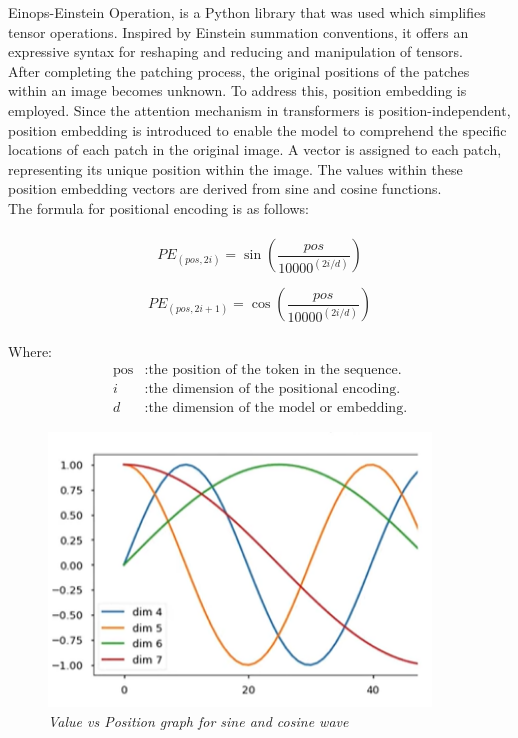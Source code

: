 Einops-Einstein Operation, is a Python library that was used which simplifies tensor operations. Inspired by Einstein summation conventions, it offers an expressive syntax for reshaping and reducing and manipulation of tensors. \\

After completing the patching process, the original positions of the patches within an image becomes unknown. To address this, position embedding is employed. Since the attention mechanism in transformers is position-independent, position embedding is introduced to enable the model to comprehend the specific locations of each patch in the original image. A vector is assigned to each patch, representing its unique position within the image. The values within these position embedding vectors are derived from sine and cosine functions.\\
The formula for positional encoding is as follows:\\
\\
\[
PE_{(pos, 2i)} = \sin\left(\frac{pos}{{10000}^{(2i/d)}}\right)
\]

\[
PE_{(pos, 2i+1)} = \cos\left(\frac{pos}{{10000}^{(2i/d)}}\right)
\]
\\
Where:
\begin{align*}
    \text{pos} & : \text{the position of the token in the sequence.} \\
    i & : \text{the dimension of the positional encoding.} \\
    d & : \text{the dimension of the model or embedding.}
\end{align*}

\begin{figure}[htbp]
    \centering
    \includegraphics[width=4in]{img/plot for sine and cosine wave.png}
    \caption{\textit{Value vs Position graph for sine and cosine wave}}
\end{figure}

